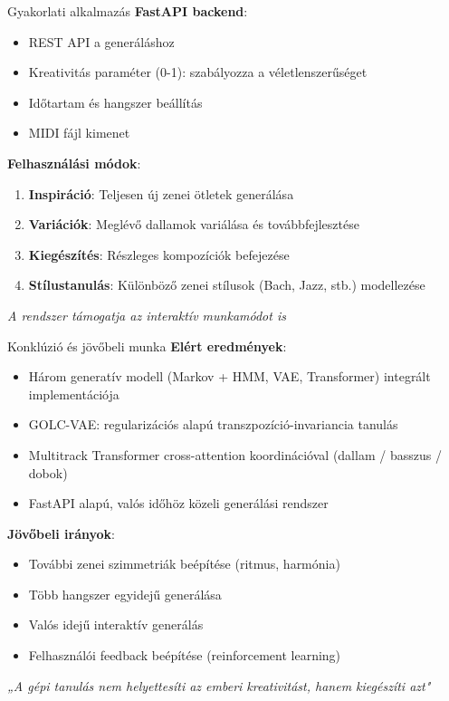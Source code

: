 \documentclass[aspectratio=169]{beamer}
\begin{document}
\begin{frame}{Gyakorlati alkalmazás}
\textbf{FastAPI backend}:
\begin{itemize}
    \item REST API a generáláshoz
    \item Kreativitás paraméter (0-1): szabályozza a véletlenszerűséget
    \item Időtartam és hangszer beállítás
    \item MIDI fájl kimenet
\end{itemize}

\vspace{0.5em}
\textbf{Felhasználási módok}:
\begin{enumerate}
    \item \textbf{Inspiráció}: Teljesen új zenei ötletek generálása
    \item \textbf{Variációk}: Meglévő dallamok variálása és továbbfejlesztése
    \item \textbf{Kiegészítés}: Részleges kompozíciók befejezése
    \item \textbf{Stílustanulás}: Különböző zenei stílusok (Bach, Jazz, stb.) modellezése
\end{enumerate}

\vspace{0.5em}
\begin{center}
\textit{A rendszer támogatja az interaktív munkamódot is}
\end{center}
\end{frame}

\begin{frame}{Konklúzió és jövőbeli munka}
\textbf{Elért eredmények}:
\begin{itemize}
    \item[\checkmark] Három generatív modell (Markov + HMM, VAE, Transformer) integrált implementációja
    \item[\checkmark] \alert{GOLC-VAE}: regularizációs alapú transzpozíció-invariancia tanulás
    \item[\checkmark] Multitrack Transformer cross-attention koordinációval (dallam / basszus / dobok)
    \item[\checkmark] FastAPI alapú, valós időhöz közeli generálási rendszer
\end{itemize}

\vspace{0.5em}
\textbf{Jövőbeli irányok}:
\begin{itemize}
    \item További zenei szimmetriák beépítése (ritmus, harmónia)
    \item Több hangszer egyidejű generálása
    \item Valós idejű interaktív generálás
    \item Felhasználói feedback beépítése (reinforcement learning)
\end{itemize}

\vspace{0.5em}
\begin{center}
\textit{„A gépi tanulás nem helyettesíti az emberi kreativitást, hanem kiegészíti azt"}
\end{center}
\end{frame}
\end{document}
